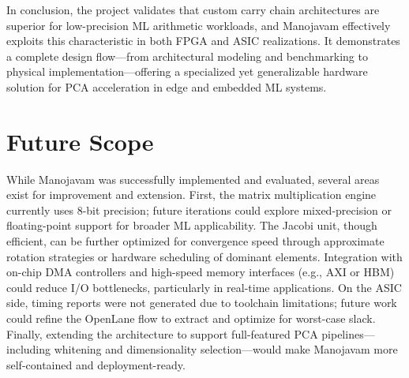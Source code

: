 In conclusion, the project validates that custom carry chain architectures are superior for low-precision ML arithmetic workloads, and Manojavam effectively exploits this characteristic in both FPGA and ASIC realizations. It demonstrates a complete design flow—from architectural modeling and benchmarking to physical implementation—offering a specialized yet generalizable hardware solution for PCA acceleration in edge and embedded ML systems.

\begin{comment}
This chapter should not contain an introduction paragraph like other chapters. You can directly write conclusion of the work done under this section. Typically this section can have 3 to 4 paragraphs. 

First paragraph should bring in the scenario of the project and every objective should be explained here.

Second paragraph should say how the objectives are implemented and achieved.

Last paragraph should draw the conclusions from each objective with quantitative results, performance improvement etc. 
\end{comment}

\section{Future Scope}
While Manojavam was successfully implemented and evaluated, several areas exist for improvement and extension. First, the matrix multiplication engine currently uses 8-bit precision; future iterations could explore mixed-precision or floating-point support for broader ML applicability. The Jacobi unit, though efficient, can be further optimized for convergence speed through approximate rotation strategies or hardware scheduling of dominant elements. Integration with on-chip DMA controllers and high-speed memory interfaces (e.g., AXI or HBM) could reduce I/O bottlenecks, particularly in real-time applications. On the ASIC side, timing reports were not generated due to toolchain limitations; future work could refine the OpenLane flow to extract and optimize for worst-case slack. Finally, extending the architecture to support full-featured PCA pipelines—including whitening and dimensionality selection—would make Manojavam more self-contained and deployment-ready.

\begin{comment}
Briefly discuss the constraints and limitations of the project and state the possibilities of extending the work in future.
\end{comment}

